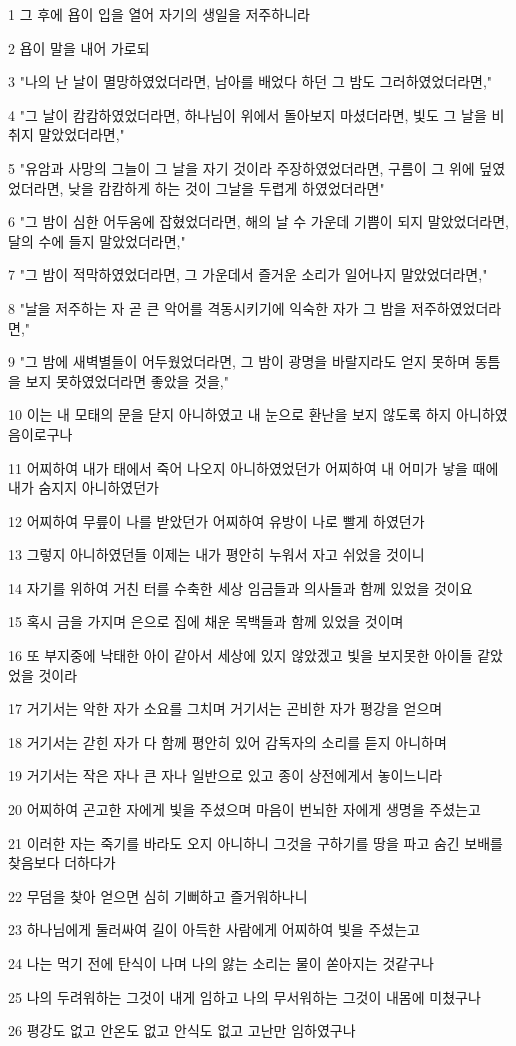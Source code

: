 \par 1 그 후에 욥이 입을 열어 자기의 생일을 저주하니라
\par 2 욥이 말을 내어 가로되
\par 3 "나의 난 날이 멸망하였었더라면, 남아를 배었다 하던 그 밤도 그러하였었더라면,"
\par 4 "그 날이 캄캄하였었더라면, 하나님이 위에서 돌아보지 마셨더라면, 빛도 그 날을 비취지 말았었더라면,"
\par 5 "유암과 사망의 그늘이 그 날을 자기 것이라 주장하였었더라면, 구름이 그 위에 덮였었더라면, 낮을 캄캄하게 하는 것이 그날을 두렵게 하였었더라면"
\par 6 "그 밤이 심한 어두움에 잡혔었더라면, 해의 날 수 가운데 기쁨이 되지 말았었더라면, 달의 수에 들지 말았었더라면,"
\par 7 "그 밤이 적막하였었더라면, 그 가운데서 즐거운 소리가 일어나지 말았었더라면,"
\par 8 "날을 저주하는 자 곧 큰 악어를 격동시키기에 익숙한 자가 그 밤을 저주하였었더라면,"
\par 9 "그 밤에 새벽별들이 어두웠었더라면, 그 밤이 광명을 바랄지라도 얻지 못하며 동틈을 보지 못하였었더라면 좋았을 것을,"
\par 10 이는 내 모태의 문을 닫지 아니하였고 내 눈으로 환난을 보지 않도록 하지 아니하였음이로구나
\par 11 어찌하여 내가 태에서 죽어 나오지 아니하였었던가 어찌하여 내 어미가 낳을 때에 내가 숨지지 아니하였던가
\par 12 어찌하여 무릎이 나를 받았던가 어찌하여 유방이 나로 빨게 하였던가
\par 13 그렇지 아니하였던들 이제는 내가 평안히 누워서 자고 쉬었을 것이니
\par 14 자기를 위하여 거친 터를 수축한 세상 임금들과 의사들과 함께 있었을 것이요
\par 15 혹시 금을 가지며 은으로 집에 채운 목백들과 함께 있었을 것이며
\par 16 또 부지중에 낙태한 아이 같아서 세상에 있지 않았겠고 빛을 보지못한 아이들 같았었을 것이라
\par 17 거기서는 악한 자가 소요를 그치며 거기서는 곤비한 자가 평강을 얻으며
\par 18 거기서는 갇힌 자가 다 함께 평안히 있어 감독자의 소리를 듣지 아니하며
\par 19 거기서는 작은 자나 큰 자나 일반으로 있고 종이 상전에게서 놓이느니라
\par 20 어찌하여 곤고한 자에게 빛을 주셨으며 마음이 번뇌한 자에게 생명을 주셨는고
\par 21 이러한 자는 죽기를 바라도 오지 아니하니 그것을 구하기를 땅을 파고 숨긴 보배를 찾음보다 더하다가
\par 22 무덤을 찾아 얻으면 심히 기뻐하고 즐거워하나니
\par 23 하나님에게 둘러싸여 길이 아득한 사람에게 어찌하여 빛을 주셨는고
\par 24 나는 먹기 전에 탄식이 나며 나의 앓는 소리는 물이 쏟아지는 것같구나
\par 25 나의 두려워하는 그것이 내게 임하고 나의 무서워하는 그것이 내몸에 미쳤구나
\par 26 평강도 없고 안온도 없고 안식도 없고 고난만 임하였구나


